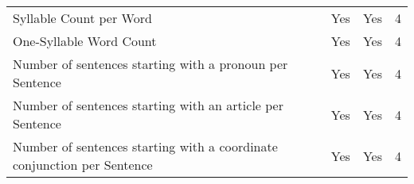\begin{table}[htbp]
\begin{tabular}{m{} c c c}
        Syllable Count per Word & Yes & Yes & 4 \\
        One-Syllable Word Count & Yes & Yes & 4 \\
        Number of sentences starting with a pronoun per Sentence & Yes & Yes & 4 \\
        Number of sentences starting with an article per Sentence & Yes & Yes & 4 \\
        Number of sentences starting with a coordinate conjunction per Sentence & Yes & Yes & 4 \\
        \bottomrule
    \end{tabular}
\end{table}
